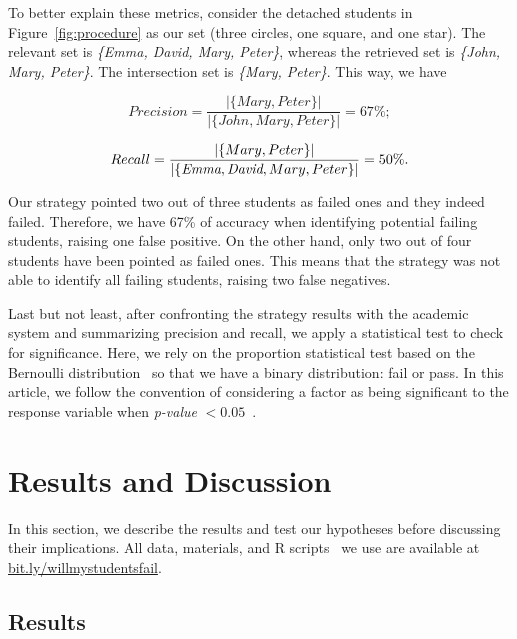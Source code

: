 To better explain these metrics, consider the detached students in Figure~\ref{fig:procedure} as our set (three circles, one square, and one star). The relevant set is \textit{\{Emma, David, Mary, Peter\}}, whereas the retrieved set is \textit{\{John, Mary, Peter\}}. The intersection set is \textit{\{Mary, Peter\}}. This way, we have

\vspace{0.2cm}
\noindent
\scriptsize
\begin{minipage}{.5\linewidth}
\centering
$$
Precision = \frac{|\{Mary, Peter\}|}{|\{John, Mary, Peter\}|} = 67\%;
$$
\end{minipage}
\begin{minipage}{.5\linewidth}
$$
Recall = \frac{|\{Mary, Peter\}|}{|\{\textit{\text{Emma}}, \textit{\text{David}}, Mary, Peter\}|} = 50\%.
$$
\end{minipage}
\normalsize
\vspace{0.2cm}

Our strategy pointed two out of three students as failed ones and they indeed failed. Therefore, we have 67\% of accuracy when identifying potential failing students, raising one false positive. On the other hand, only two out of four students have been pointed as failed ones. This means that the strategy was not able to identify all failing students, raising two false negatives.

Last but not least, after confronting the strategy results with the academic system and summarizing precision and recall, we apply a statistical test to check for significance. Here, we rely on the proportion statistical test based on the Bernoulli distribution~\cite{linear-models-1989} so that we have a binary distribution: fail or pass. In this article, we follow the convention of considering a factor as being significant to the response variable when \textit{p-value} $< 0.05$~\cite{box-statistics-for-experimenters}.

\section{Results and Discussion}

\label{sec:results}

In this section, we describe the results and test our hypotheses before discussing their implications. All data, materials, and R scripts~\cite{r-statistical} we use are available at \url{bit.ly/willmystudentsfail}.

\subsection{Results}

